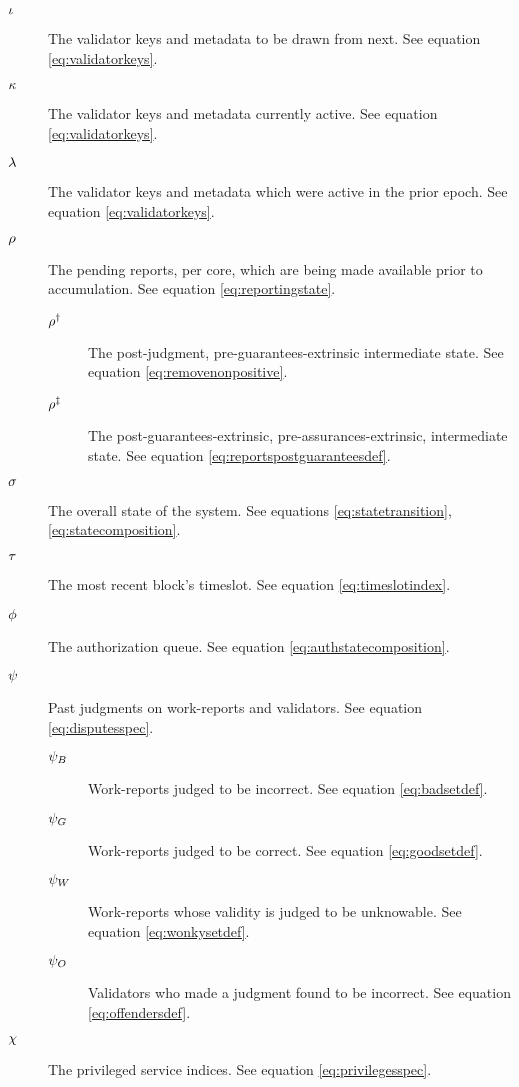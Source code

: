 \begin{description}
  \item[$\iota$] The validator keys and metadata to be drawn from next. See equation \ref{eq:validatorkeys}.
  \item[$\kappa$] The validator keys and metadata currently active. See equation \ref{eq:validatorkeys}.
  \item[$\lambda$] The validator keys and metadata which were active in the prior epoch. See equation \ref{eq:validatorkeys}.
  \item[$\rho$] The pending reports, per core, which are being made available prior to accumulation. See equation \ref{eq:reportingstate}.
  \begin{description}
    \item[$\rho^\dagger$] The post-judgment, pre-guarantees-extrinsic intermediate state. See equation \ref{eq:removenonpositive}.
    \item[$\rho^\ddagger$] The post-guarantees-extrinsic, pre-assurances-extrinsic, intermediate state. See equation \ref{eq:reportspostguaranteesdef}.
  \end{description}
  \item[$\sigma$] The overall state of the system. See equations \ref{eq:statetransition}, \ref{eq:statecomposition}.
  \item[$\tau$] The most recent block's timeslot. See equation \ref{eq:timeslotindex}.
  \item[$\phi$] The authorization queue. See equation \ref{eq:authstatecomposition}.
  \item[$\psi$] Past judgments on work-reports and validators. See equation \ref{eq:disputesspec}.
  \begin{description}
    \item[$\psi_B$] Work-reports judged to be incorrect. See equation \ref{eq:badsetdef}.
    \item[$\psi_G$] Work-reports judged to be correct. See equation \ref{eq:goodsetdef}.
    \item[$\psi_W$] Work-reports whose validity is judged to be unknowable. See equation \ref{eq:wonkysetdef}.
    \item[$\psi_O$] Validators who made a judgment found to be incorrect. See equation \ref{eq:offendersdef}.
  \end{description}
  \item[$\chi$] The privileged service indices. See equation \ref{eq:privilegesspec}.
  \begin{description}

\end{description}
\end{description}
